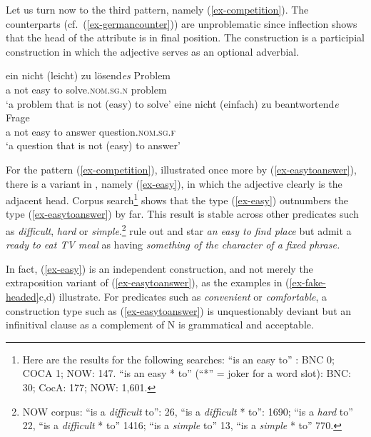 \documentclass[output=paper
  ,nobabel
  ,uniformtopskip %
]{langscibook}
\begin{document}
Let us turn now to the third pattern, namely (\ref{ex-competition}). The  counterparts (cf.\ (\ref{ex-germancounter})) are unproblematic since inflection shows that the head of the attribute is in final position. The construction is a participial construction in which the adjective serves as an optional adverbial.

\eal\label{ex-germancounter}
\ex 
\gll ein nicht (leicht) zu lösend\emph{es} Problem \\
     a not \spacebr{}easy to solve.\textsc{nom.sg.n} problem \\
\glt `a problem that is not (easy) to solve'
\ex 
\gll eine nicht (einfach) zu beantwortend\emph{e} Frage \\
     a not \spacebr{}easy to answer question.\textsc{nom.sg.f}	\\
\glt `a question that is not (easy) to answer'
\zl

\largerpage[-1]
\noindent
For the pattern (\ref{ex-competition}), illustrated once more by (\ref{ex-easytoanswer}), there is a variant in , namely (\ref{ex-easy}), in which the adjective clearly is the adjacent head. Corpus search\footnote{Here are the results for the following searches:
\ea ``is an easy to''	: 	BNC   0;  COCA  1;  NOW:  147.
\ex ``is an easy * to'' (``*'' = joker for a word slot): BNC: 30; CocA: 177; NOW: 1,601.
\z}
shows that the type (\ref{ex-easy}) outnumbers the type (\ref{ex-easytoanswer}) by far. This result is stable across other predicates such as \emph{difficult}, \emph{hard} or \emph{simple}.\footnote{NOW corpus: ``is a \emph{difficult} to'': 26, ``is a \emph{difficult} * to'': 1690; ``is a \emph{hard} to'' 22, ``is a \emph{difficult} * to'' 1416; ``is a \emph{simple} to'' 13, ``is a \emph{simple} * to'' 770.} \citet*[551]{HuddlestonPullum2002} rule out and star \emph{an easy to find place} but admit a \emph{ready to eat TV meal} as having \emph{something of the character of a fixed phrase.}

In fact, (\ref{ex-easy}) is an independent construction, and not merely the extraposition variant of
(\ref{ex-easytoanswer}), as the examples in (\ref{ex-fake-headed}c,d) illustrate. For predicates
such as \emph{convenient} or \emph{comfortable}, a construction type such as (\ref{ex-easytoanswer})
is unquestionably deviant but an infinitival clause as a complement of N is grammatical and
acceptable.

\pagebreak
\eal\label{ex-fake-headed}
\label{ex-easytoanswer}
\label{ex-easy}
\label{ex-price}
\label{ex-car}
\zl
\end{document}
